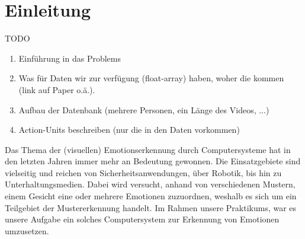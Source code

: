\chapter{Einleitung}
TODO

\begin{enumerate}
  \item Einführung in das Problems
  \item Was für Daten wir zur verfügung (float-array) haben, woher die kommen (link auf Paper o.ä.).
  \item Aufbau der Datenbank (mehrere Personen, ein Länge des Videos, ...)
  \item Action-Units beschreiben (nur die in den Daten vorkommen)
\end{enumerate}

Das Thema der (visuellen) Emotionserkennung durch Computersysteme hat in den letzten Jahren immer mehr an Bedeutung gewonnen.
Die Einsatzgebiete sind vielseitig und reichen von Sicherheitsanwendungen, über Robotik, bis hin zu Unterhaltungsmedien.
Dabei wird versucht, anhand von verschiedenen Mustern, einem Gesicht eine oder mehrere Emotionen zuzuordnen, weshalb es sich
um ein Teilgebiet der Mustererkennung handelt.\newline
Im Rahmen unsere Praktikums, war es unsere Aufgabe ein solches Computersystem zur Erkennung von Emotionen umzusetzen.